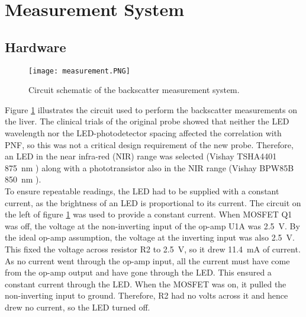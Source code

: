 \section{Measurement System}
\subsection{Hardware}

\begin{figure}[htb]
	\centering
	\texttt{[image: measurement.PNG]}
	\caption{Circuit schematic of the backscatter measurement system.}
	\label{fig: measurement schematic}
\end{figure}

Figure \ref{fig: measurement schematic} illustrates the circuit used to perform the backscatter measurements on the liver. The clinical trials of the original probe showed that neither the LED wavelength nor the LED-photodetector spacing affected the correlation with PNF, so this was not a critical design requirement of the new probe. Therefore, an LED in the near infra-red (NIR) range was selected (Vishay TSHA4401 \SI{875}{\nano\metre} \cite{tsha4401}) along with a phototransistor also in the NIR range (Vishay BPW85B \SI{850}{\nano\metre} \cite{bpw85b}).\\

To ensure repeatable readings, the LED had to be supplied with a constant current, as the brightness of an LED is proportional to its current. The circuit on the left of figure \ref{fig: measurement schematic} was used to provide a constant current. When MOSFET Q1 was off, the voltage at the non-inverting input of the op-amp U1A was \SI{2.5}{\volt}. By the ideal op-amp assumption, the voltage at the inverting input was also \SI{2.5}{\volt}. This fixed the voltage across resistor R2 to \SI{2.5}{\volt}, so it drew \SI{11.4}{\milli\ampere} of current. As no current went through the op-amp input, all the current must have come from the op-amp output and have gone through the LED.  This ensured a constant current through the LED. When the MOSFET was on, it pulled the non-inverting input to ground. Therefore, R2 had no volts across it and hence drew no current, so the LED turned off.\\

